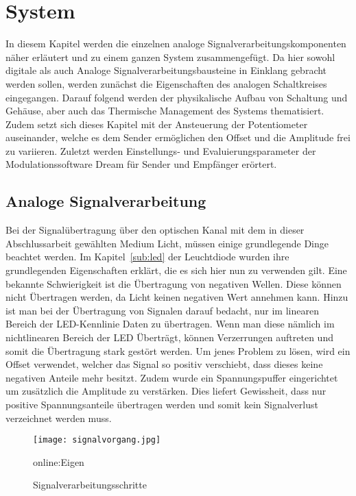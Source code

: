 
\chapter{System}
\label{sec:system}
In diesem Kapitel werden die einzelnen analoge Signalverarbeitungskomponenten näher erläutert und zu einem ganzen System zusammengefügt. Da hier sowohl digitale als auch Analoge Signalverarbeitungsbausteine in Einklang gebracht werden sollen, werden zunächst die Eigenschaften des analogen Schaltkreises eingegangen. Darauf folgend werden der physikalische Aufbau von Schaltung und Gehäuse, aber auch das Thermische Management des Systems thematisiert. Zudem setzt sich dieses Kapitel mit der Ansteuerung der Potentiometer auseinander, welche es dem Sender ermöglichen den Offset und die Amplitude frei zu variieren. Zuletzt werden Einstellungs- und Evaluierungsparameter der Modulationssoftware Dream für Sender und Empfänger erörtert.


\section{Analoge Signalverarbeitung}
\label{sec:Signalverarbeitung}
Bei der Signalübertragung über den optischen Kanal mit dem in dieser Abschlussarbeit gewählten Medium Licht, müssen einige grundlegende Dinge beachtet werden. Im Kapitel~\ref{sub:led} der Leuchtdiode wurden ihre grundlegenden Eigenschaften erklärt, die es sich hier nun zu verwenden gilt. Eine bekannte Schwierigkeit ist die Übertragung von negativen Wellen. Diese können nicht Übertragen werden, da Licht keinen negativen Wert annehmen kann. Hinzu ist man bei der Übertragung von Signalen darauf bedacht, nur im linearen Bereich der LED-Kennlinie Daten zu übertragen. Wenn man diese nämlich im nichtlinearen Bereich der LED Überträgt, können Verzerrungen auftreten und somit die Übertragung stark gestört werden. Um jenes Problem zu lösen, wird ein Offset verwendet, welcher das Signal so positiv verschiebt, dass dieses keine negativen Anteile mehr besitzt. Zudem wurde ein Spannungspuffer eingerichtet um zusätzlich die Amplitude zu verstärken. Dies liefert Gewissheit, dass nur positive Spannungsanteile übertragen werden und somit kein Signalverlust verzeichnet werden muss.

\begin{figure}[H]
	\centering
	\texttt{[image: signalvorgang.jpg]}
	\caption[Signalverarbeitungsschritte]{Signalverarbeitungsschritte} \gls{online:Eigen}
	\label{fig:signalvorgang}
\end{figure}

